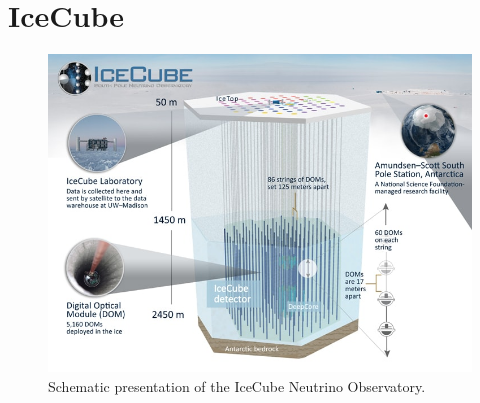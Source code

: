 \section{IceCube}
\blindtext[5]

\begin{figure}
  \centering
  \includegraphics[width=\textwidth]{content/img/icecube_detector_schematic.jpg}
  \caption{
    Schematic presentation of the IceCube Neutrino Observatory. \cite{icecube_homepage}
  }
  \label{fig:img:icecube}
\end{figure}
